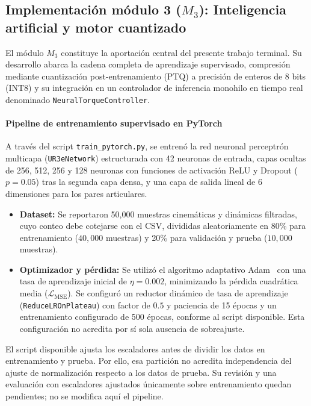 \documentclass[12pt]{article}
\begin{document}
\subsection{Implementación módulo 3 ($M_3$): Inteligencia artificial y motor cuantizado}
\label{sec:imp_m3}

El módulo $M_3$ constituye la aportación central del presente trabajo terminal. Su desarrollo abarca la cadena completa de aprendizaje supervisado, compresión mediante cuantización post-entrenamiento (PTQ) a precisión de enteros de 8 bits (INT8) y su integración en un controlador de inferencia monohilo en tiempo real denominado \texttt{NeuralTorqueController}.

\paragraph{Pipeline de entrenamiento supervisado en PyTorch}
A través del script \texttt{train\_pytorch.py}, se entrenó la red neuronal perceptrón multicapa (\texttt{UR3eNetwork}) estructurada con 42 neuronas de entrada, capas ocultas de 256, 512, 256 y 128 neuronas con funciones de activación ReLU y Dropout ($p=0.05$) tras la segunda capa densa, y una capa de salida lineal de 6 dimensiones para los pares articulares.
\begin{itemize}
    \item \textbf{Dataset:} Se reportaron 50,000 muestras cinemáticas y dinámicas filtradas, cuyo conteo debe cotejarse con el CSV, divididas aleatoriamente en 80\% para entrenamiento ($40,000$ muestras) y 20\% para validación y prueba ($10,000$ muestras).
    \item \textbf{Optimizador y pérdida:} Se utilizó el algoritmo adaptativo Adam~\cite{kingma2014adam} con una tasa de aprendizaje inicial de $\eta = 0.002$, minimizando la pérdida cuadrática media ($\mathcal{L}_{\text{MSE}}$). Se configuró un reductor dinámico de tasa de aprendizaje (\texttt{ReduceLROnPlateau}) con factor de $0.5$ y paciencia de 15 épocas y un entrenamiento configurado de 500 épocas, conforme al script disponible. Esta configuración no acredita por sí sola ausencia de sobreajuste.
\end{itemize}

El script disponible ajusta los escaladores antes de dividir los datos en entrenamiento y prueba. Por ello, esa partición no acredita independencia del ajuste de normalización respecto a los datos de prueba. Su revisión y una evaluación con escaladores ajustados únicamente sobre entrenamiento quedan pendientes; no se modifica aquí el pipeline.
\end{document}
